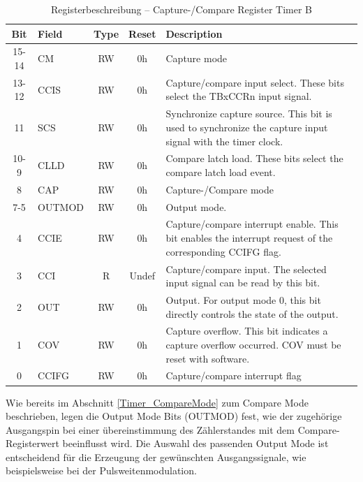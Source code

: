 \begin{table}[h!]
	\small
	\centering
	\begin{tabular}{|c|l|c|c|p{8cm}|}
		\hline
		\textbf{Bit} & \textbf{Field} & \textbf{Type} & \textbf{Reset} & \textbf{Description} \\ \hline
		15-14 & CM & RW & 0h & Capture mode \\ \hline
		13-12 & CCIS & RW & 0h & Capture/compare input select. These bits select the TBxCCRn input signal. \\ \hline
		11 & SCS & RW & 0h & Synchronize capture source. This bit is used to synchronize the capture input signal with the timer clock. \\ \hline
		10-9 & CLLD & RW & 0h & Compare latch load. These bits select the compare latch load event.  \\ \hline
		8 & CAP & RW & 0h & Capture-/Compare mode \\ \hline
		7-5 & OUTMOD & RW & 0h & Output mode. \\ \hline
		4 & CCIE & RW & 0h & Capture/compare interrupt enable. This bit enables the interrupt request of the corresponding CCIFG flag. \\ \hline
		3 & CCI & R & Undef & Capture/compare input. The selected input signal can be read by this bit. \\ \hline
		2 & OUT & RW & 0h & Output. For output mode 0, this bit directly controls the state of the output. \\ \hline
		1 & COV & RW & 0h & Capture overflow. This bit indicates a capture overflow occurred. COV must be reset with software.  \\ \hline
		0 & CCIFG & RW & 0h & Capture/compare interrupt flag \\ \hline
	\end{tabular}
	\caption{Registerbeschreibung – Capture-/Compare Register Timer B\\}
	\label{tab:tb_ccc_register}
\end{table}



Wie bereits im Abschnitt \ref{Timer_CompareMode} zum Compare Mode beschrieben, legen die Output Mode Bits (OUTMOD) fest, wie der zugeh\"orige Ausgangspin bei einer \"ubereinstimmung des Z\"ahlerstandes mit dem Compare-Registerwert beeinflusst wird. Die Auswahl des passenden Output Mode ist entscheidend f\"ur die Erzeugung der gew\"unschten Ausgangssignale, wie beispielsweise bei der Pulsweitenmodulation.

